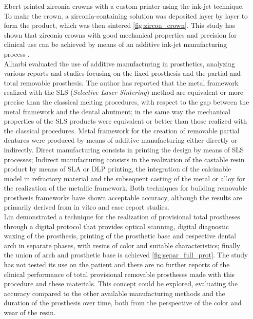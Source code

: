 Ebert printed zirconia crowns with a custom printer using the ink-jet technique. To make the crown, a zirconia-containing solution was deposited layer by layer to form the product, which was then sintered \ref{fig:zircon_crown}. This study has shown that zirconia crowns with good mechanical properties and precision for clinical use can be achieved by means of an additive ink-jet manufacturing process \parencite{Reference106}. \\
Alharbi \parencite{Reference107} evaluated the use of additive manufacturing in prosthetics, analyzing various reports and studies focusing on the fixed prosthesis and the partial and total removable prosthesis. The author has reported that the metal framework realized with the SLS (\emph{Selective Laser Sintering}) method are equivalent or more precise than the classical melting procedures, with respect to the gap between the metal framework and the dental abutment; in the same way the mechanical properties of the SLS products were equivalent or better than those realized with the classical procedures. Metal framework for the creation of removable partial dentures were produced by means of additive manufacturing either directly or indirectly. Direct manufacturing consists in printing the design by means of SLS processes; Indirect manufacturing consists in the realization of the castable resin product by means of SLA or DLP printing, the integration of the calcinable model in refractory material and the subsequent casting of the metal or alloy for the realization of the metallic framework. Both techniques for building removable prosthesis frameworks have shown acceptable accuracy, although the results are primarily derived from in vitro and case report studies. \\
Lin \parencite{Reference108} demonstrated a technique for the realization of provisional total prostheses through a digital protocol that provides optical scanning, digital diagnostic waxing of the prosthesis, printing of the prosthetic base and respective dental arch in separate phases, with resins of color and suitable characteristics; finally the union of arch and prosthetic base is achieved \ref{fig:separ_full_prot}. The study has not tested its use on the patient and there are no further reports of the clinical performance of total provisional removable prostheses made with this procedure and these materials. This concept could be explored, evaluating the accuracy compared to the other available manufacturing methods and the duration of the prosthesis over time, both from the perspective of the color and wear of the resin.\\
